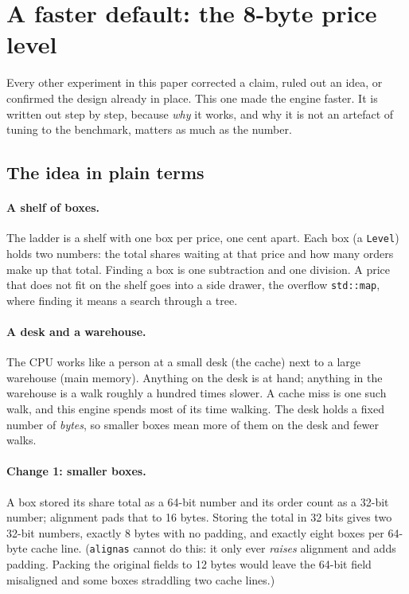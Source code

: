 \documentclass[10pt,a4paper]{article}
\newcommand{\code}[1]{\texttt{#1}}
\begin{document}
\section{A faster default: the 8-byte price level}
\label{sec:level}
Every other experiment in this paper corrected a claim, ruled out an idea, or confirmed the design already in place.
This one made the engine faster. It is written out step by step, because \emph{why} it works, and why it is not an artefact of tuning to the benchmark, matters as much as the number.

\subsection{The idea in plain terms}
\paragraph{A shelf of boxes.} The ladder is a shelf with one box per price, one cent apart. Each box (a \code{Level}) holds two numbers:
the total shares waiting at that price and how many orders make up that total. Finding a box is one subtraction and one division.
A price that does not fit on the shelf goes into a side drawer, the overflow \code{std::map}, where finding it means a search through a tree.

\paragraph{A desk and a warehouse.} The CPU works like a person at a small desk (the cache) next to a large warehouse (main memory).
Anything on the desk is at hand; anything in the warehouse is a walk roughly a hundred times slower. A cache miss is one such walk, and this engine spends most of its time walking.
The desk holds a fixed number of \emph{bytes}, so smaller boxes mean more of them on the desk and fewer walks.

\paragraph{Change 1: smaller boxes.} A box stored its share total as a 64-bit number and its order count as a 32-bit number; alignment pads that to 16 bytes.
Storing the total in 32 bits gives two 32-bit numbers, exactly 8 bytes with no padding, and exactly eight boxes per 64-byte cache line.
(\code{alignas} cannot do this: it only ever \emph{raises} alignment and adds padding. Packing the original fields to 12 bytes would leave the 64-bit field misaligned and some boxes straddling two cache lines.)
\end{document}
